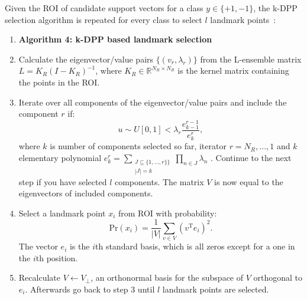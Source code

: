 \documentclass[preprint,12pt]{elsarticle}
\newtheorem*{remark}{Remark}
\begin{document}
Given the ROI of candidate support vectors for a class $y \in \{+1,-1\}$, the k-DPP selection algorithm is repeated for every class to select $l$ landmark points~\cite{kulesza2011k}: 
\begin{enumerate}
	\item[]\textbf{Algorithm 4: k-DPP based landmark selection}
	\item Calculate the eigenvector/value pairs $\{(v_r,\lambda_r)\}$ from the L-ensemble matrix $L = K_{R}(I - K_{R} )^{-1}$, where $K_{R} \in \mathbb{R}^{N_{R} \times N_{R}} $ is the kernel matrix containing the points in the ROI.
	\item Iterate over all components of the eigenvector/value pairs and include the component $r$ if:
	\begin{equation}
		u \sim U[0, 1] < \lambda_r \frac{e_{k-1}^{r-1}}{e_k^r},
	\end{equation}
	  where $k$ is number of components selected so far, iterator $r = N_{R},...,1$  and $k$ elementary polynomial $e_k^r = \sum_{\substack{J \subseteq \{1,...,r\}\} \\ |J| = k}}\prod_{n \in J} \lambda_n$ . Continue to the next step if you have selected $l$ components. The matrix $V$ is now equal to the eigenvectors of included components. 
	\item Select a landmark point $x_i$ from ROI with probability:
	\begin{equation}
		\mathrm{Pr}(x_i) = \frac{1}{|V|} \sum_{v \in V} (v^\mathrm{T} e_i)^2.
	\end{equation} 
	The vector $e_i$ is the $i$th standard basis, which is all zeros except for a one
	in the $i$th position.
	\item Recalculate $V \leftarrow V_\perp$, an orthonormal basis for the subspace of $V$ orthogonal to $e_i$. Afterwards go back to step 3 until $l$ landmark points are selected.
\end{enumerate}

	
\end{document}
